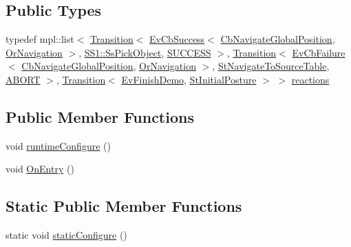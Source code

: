 \subsection*{Public Types}
\begin{DoxyCompactItemize}
\item 
typedef mpl\+::list$<$ \hyperlink{classsmacc_1_1Transition}{Transition}$<$ \hyperlink{structsmacc_1_1EvCbSuccess}{Ev\+Cb\+Success}$<$ \hyperlink{classcl__move__base__z_1_1CbNavigateGlobalPosition}{Cb\+Navigate\+Global\+Position}, \hyperlink{classsm__fetch__two__table__whiskey__pour_1_1OrNavigation}{Or\+Navigation} $>$, \hyperlink{structsm__fetch__two__table__whiskey__pour_1_1SS1_1_1SsPickObject}{S\+S1\+::\+Ss\+Pick\+Object}, \hyperlink{structsmacc_1_1default__transition__tags_1_1SUCCESS}{S\+U\+C\+C\+E\+SS} $>$, \hyperlink{classsmacc_1_1Transition}{Transition}$<$ \hyperlink{structsmacc_1_1EvCbFailure}{Ev\+Cb\+Failure}$<$ \hyperlink{classcl__move__base__z_1_1CbNavigateGlobalPosition}{Cb\+Navigate\+Global\+Position}, \hyperlink{classsm__fetch__two__table__whiskey__pour_1_1OrNavigation}{Or\+Navigation} $>$, \hyperlink{structsm__fetch__two__table__whiskey__pour_1_1StNavigateToSourceTable}{St\+Navigate\+To\+Source\+Table}, \hyperlink{structsmacc_1_1default__transition__tags_1_1ABORT}{A\+B\+O\+RT} $>$, \hyperlink{classsmacc_1_1Transition}{Transition}$<$ \hyperlink{structsm__fetch__two__table__whiskey__pour_1_1EvFinishDemo}{Ev\+Finish\+Demo}, \hyperlink{structsm__fetch__two__table__whiskey__pour_1_1StInitialPosture}{St\+Initial\+Posture} $>$ $>$ \hyperlink{structsm__fetch__two__table__whiskey__pour_1_1StNavigateToSourceTable_ab9e387d50eba6f856523c58add1a30d1}{reactions}
\end{DoxyCompactItemize}
\subsection*{Public Member Functions}
\begin{DoxyCompactItemize}
\item 
void \hyperlink{structsm__fetch__two__table__whiskey__pour_1_1StNavigateToSourceTable_a843dcb687e92efc046efbb78da5a1258}{runtime\+Configure} ()
\item 
void \hyperlink{structsm__fetch__two__table__whiskey__pour_1_1StNavigateToSourceTable_a417751651b6b4645da89173c9556d714}{On\+Entry} ()
\end{DoxyCompactItemize}
\subsection*{Static Public Member Functions}
\begin{DoxyCompactItemize}
\item 
static void \hyperlink{structsm__fetch__two__table__whiskey__pour_1_1StNavigateToSourceTable_af2e95f2cad60afa063155b900c1c9c96}{static\+Configure} ()
\end{DoxyCompactItemize}
